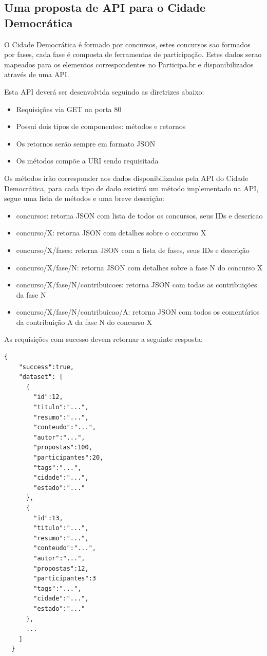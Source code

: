 \documentclass[12pt]{article}
\begin{document}
\subsection{Uma proposta de API para o Cidade Democrática}

O Cidade Democrática é formado por concursos, estes concursos sao formados por
fases, cada fase é composta de ferramentas de participação. Estes dados serao
mapeados para os elementos correspondentes no Participa.br e disponibilizados
através de uma API.

Esta API deverá ser desenvolvida seguindo as diretrizes abaixo:

\begin{itemize}
  \item Requisições via GET na porta 80
  \item Possui dois tipos de componentes: métodos e retornos
  \item Os retornos serão sempre em formato JSON
  \item Os métodos compõe a URI sendo requisitada
\end{itemize}

Os métodos irão corresponder aos dados disponibilizados pela API do Cidade
Democrática, para cada tipo de dado existirá um método implementado na API,
segue uma lista de métodos e uma breve descrição:

\begin{itemize}
  \item concursos: retorna JSON com lista de todos os concursos, seus IDs e descricao
  \item concurso/X: retorna JSON com detalhes sobre o concurso X
  \item concurso/X/fases: retorna JSON com a lista de fases, seus IDs e descrição
  \item concurso/X/fase/N: retorna JSON com detalhes sobre a fase N do concurso X
  \item concurso/X/fase/N/contribuicoes: retorna JSON com todas as contribuições da fase N
  \item concurso/X/fase/N/contribuicao/A: retorna JSON com todos os comentários da contribuição A da fase N do concurso X
\end{itemize}

As requisições com sucesso devem retornar a seguinte resposta:

\begin{framed}
\begin{lstlisting}[caption=Exemplo de retorno JSON com a lista de todos os concursos]
  {
    "success":true,
    "dataset": [
      {
        "id":12,
        "titulo":"...",
        "resumo":"...",
        "conteudo":"...",
        "autor":"...",
        "propostas":100,
        "participantes":20,
        "tags":"...",
        "cidade":"...",
        "estado":"..."
      },
      {
        "id":13,
        "titulo":"...",
        "resumo":"...",
        "conteudo":"...",
        "autor":"...",
        "propostas":12,
        "participantes":3
        "tags":"...",
        "cidade":"...",
        "estado":"..."
      },
      ...
    ]
  }
\end{lstlisting}
\end{framed}
\end{document}
